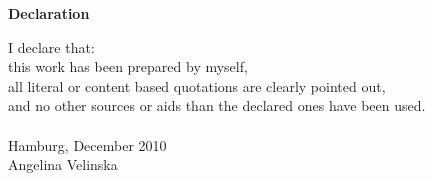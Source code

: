 \bigskip
\bigskip

\pagebreak\par
{\Large\noindent \textbf{Declaration}}\\

\bigskip
\bigskip

\noindent I declare that:\\
this work has been prepared by myself,\\
all literal or content based quotations are clearly pointed out,\\
and no other sources or aids than the declared ones have been used.\\
\vspace{3cm}\\
Hamburg, December 2010 \\
Angelina Velinska
\pagebreak 
